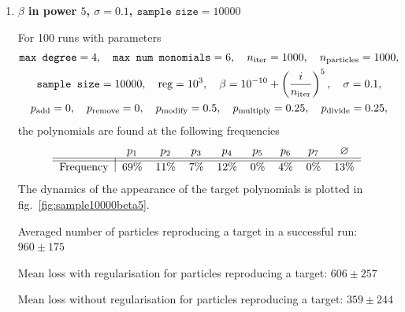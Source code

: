 \documentclass[11pt]{article}
\begin{document}
\begin{enumerate}
	  \item {\bfseries \boldmath $\beta$ in power $5$, $\sigma = 0.1$, $\texttt{sample size} = 10000$}

  		For 100 runs with parameters
		\begin{equation}
			\begin{gathered}
				\texttt{max degree} = 4, \quad \texttt{max num monomials} = 6, \quad n_{\rm iter} = 1000, \quad n_{\rm particles} = 1000, \\
				\texttt{sample size} = 10000, \quad {\rm reg} = 10^{3}, \quad \beta = 10^{-10} + \left(\frac{i}{n_{\rm iter}}\right)^{5}, \quad \sigma = 0.1, \\
				p_{\rm add} = 0, \quad p_{\rm remove} = 0, \quad p_{\rm modify} = 0.5, \quad p_{\rm multiply} = 0.25, \quad p_{\rm divide} = 0.25,
			\end{gathered}
		\end{equation}
		the polynomials are found at the following frequencies
	  \begin{equation}
	  	\begin{tabular}{l|cccccccc}
	  		& $p_{1}$ & $p_{2}$ & $p_{3}$ & $p_{4}$ & $p_{5}$ & $p_{6}$ & $p_{7}$ & $\varnothing$ \\\hline\hline
	  		Frequency & 69\% & 11\% & 7\% & 12\% & 0\% & 4\% & 0\% & 13\%
	  	\end{tabular}
	  \end{equation}
	  The dynamics of the appearance of the target polynomials is plotted in fig.~\ref{fig:sample10000beta5}.

	  Averaged number of particles reproducing a target in a successful run: $960 \pm 175$

	  Mean loss with regularisation for particles reproducing a target: $606 \pm 257$

	  Mean loss without regularisation for particles reproducing a target: $359 \pm 244$


\end{enumerate}
\end{document}

